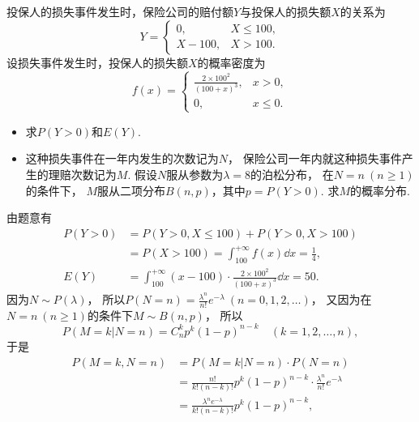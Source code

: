 \begin{example}
投保人的损失事件发生时，保险公司的赔付额\(Y\)与投保人的损失额\(X\)的关系为\begin{equation*}
	Y = \left\{ \begin{array}{cl}
		0, & X \leq 100, \\
		X-100, & X > 100.
	\end{array} \right.
\end{equation*}
设损失事件发生时，投保人的损失额\(X\)的概率密度为\begin{equation*}
	f(x) = \left\{ \begin{array}{cl}
		\frac{2\times100^2}{(100+x)^3}, & x > 0, \\
		0, & x \leq 0.
	\end{array} \right.
\end{equation*}
\begin{itemize}
	\item 求\(P(Y>0)\)和\(E(Y)\).
	\item 这种损失事件在一年内发生的次数记为\(N\)，
	保险公司一年内就这种损失事件产生的理赔次数记为\(M\).
	假设\(N\)服从参数为\(\lambda=8\)的泊松分布，
	在\(N=n\ (n\geq1)\)的条件下，
	\(M\)服从二项分布\(B(n,p)\)，其中\(p = P(Y>0)\).
	求\(M\)的概率分布.
\end{itemize}
\begin{solution}
由题意有\begin{align*}
	P(Y>0)
	&= P(Y>0,X\leq100) + P(Y>0,X>100) \\
	&= P(X>100)
	= \int_{100}^{+\infty} f(x) \dd{x}
	= \frac14, \\
	E(Y)
	&= \int_{100}^{+\infty} (x-100) \cdot \frac{2\times100^2}{(100+x)^3} \dd{x}
	= 50.
\end{align*}
因为\(N \sim P(\lambda)\)，
所以\(P(N=n) = \frac{\lambda^n}{n!} e^{-\lambda}\ (n=0,1,2,\dotsc)\)，
又因为在\(N=n\ (n\geq1)\)的条件下\(M \sim B(n,p)\)，
所以\begin{equation*}
	P(M=k \vert N=n)
	= C_n^k p^k (1-p)^{n-k}
	\quad(k=1,2,\dotsc,n),
\end{equation*}
于是\begin{align*}
	P(M=k,N=n)
	&= P(M=k \vert N=n) \cdot P(N=n) \\
	&= \frac{n!}{k! (n-k)!} p^k (1-p)^{n-k}
	\cdot \frac{\lambda^n}{n!} e^{-\lambda} \\
	&= \frac{\lambda^n e^{-\lambda}}{k! (n-k)!} p^k (1-p)^{n-k},

\end{align*}
\end{solution}
\end{example}
